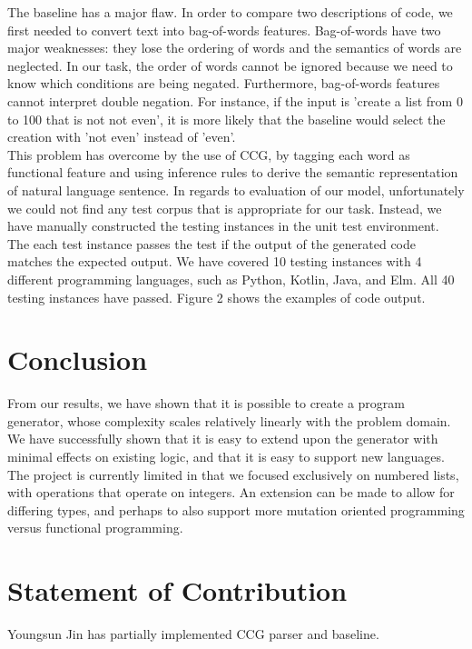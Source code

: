 \documentclass[11pt,letterpaper]{article}
\begin{document}
The baseline has a major flaw. In order to compare two descriptions of code, we first needed to convert text into bag-of-words features. Bag-of-words have two major weaknesses: they lose the ordering of words and the semantics of words are neglected. In our task, the order of words cannot be ignored because we need to know which conditions are being negated. Furthermore, bag-of-words features cannot interpret double negation. For instance, if the input is 'create a list from 0 to 100 that is not not even', it is more likely that the baseline would select the creation with 'not even' instead of 'even'.\\ 

This problem has overcome by the use of CCG, by tagging each word as functional feature and using inference rules to derive the semantic representation of natural language sentence. In regards to evaluation of our model, unfortunately we could not find any test corpus that is appropriate for our task. Instead, we have manually constructed the testing instances in the unit test environment. The each test instance passes the test if the output of the generated code matches the expected output. We have covered 10 testing instances with 4 different programming languages, such as Python, Kotlin, Java, and Elm. All 40 testing instances have passed. Figure 2 shows the examples of code output. 

\section{Conclusion}

From our results, we have shown that it is possible to create a program generator, whose complexity scales relatively linearly with the problem domain.
We have successfully shown that it is easy to extend upon the generator with minimal effects on existing logic, and that it is easy to support new languages.
The project is currently limited in that we focused exclusively on numbered lists, with operations that operate on integers.
An extension can be made to allow for differing types, and perhaps to also support more mutation oriented programming versus functional programming.

\section{Statement of Contribution}
Youngsun Jin has partially implemented CCG parser and baseline.




\end{document}
